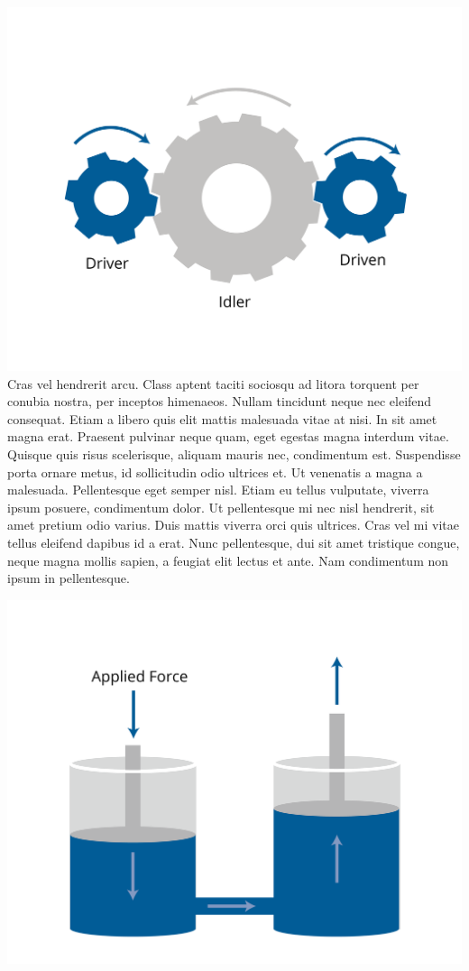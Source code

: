 \includegraphics[width=1\textwidth]{testimage_Gears.png}
Cras vel hendrerit arcu. Class aptent taciti sociosqu ad litora torquent per conubia nostra, per inceptos himenaeos. Nullam tincidunt neque nec eleifend consequat. Etiam a libero quis elit mattis malesuada vitae at nisi. In sit amet magna erat. Praesent pulvinar neque quam, eget egestas magna interdum vitae. Quisque quis risus scelerisque, aliquam mauris nec, condimentum est. Suspendisse porta ornare metus, id sollicitudin odio ultrices et. Ut venenatis a magna a malesuada. Pellentesque eget semper nisl. Etiam eu tellus vulputate, viverra ipsum posuere, condimentum dolor. Ut pellentesque mi nec nisl hendrerit, sit amet pretium odio varius. Duis mattis viverra orci quis ultrices. Cras vel mi vitae tellus eleifend dapibus id a erat. Nunc pellentesque, dui sit amet tristique congue, neque magna mollis sapien, a feugiat elit lectus et ante. Nam condimentum non ipsum in pellentesque.


\includegraphics[width=1\textwidth]{testimage_Hydraulics.png}

